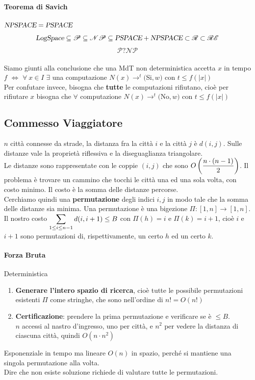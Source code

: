 \documentclass[10pt]{book}
\begin{document}
\paragraph{Teorema di Savich} $\textsl{NPSPACE} = \textsl{PSPACE}$
$$\textsl{LogSpace} \subseteq \mathscr{P} \subseteq \mathscr{NP} \subseteq \textsl{PSPACE} + \textsl{NPSPACE} \subset \mathscr{R} \subset \mathscr{RE}$$
$$\mathscr{P} ? \mathscr{NP}$$
\paragraph{} Siamo giunti alla conclusione che una MdT non deterministica accetta $x$ in tempo $f$ $\Leftrightarrow$ $\forall\:x\in I$ $\exists$ una computazione $N(x)\rightarrow^t($Si$, w)$ con $t \leq f(|x|)$\\
Per confutare invece, bisogna che \textbf{tutte} le computazioni rifiutano, cioè per rifiutare $x$ bisogna che $\forall$ computazione $N(x) \rightarrow^t ($No$, w)$ con $t \leq f(|x|)$
\subsection{Commesso Viaggiatore}
$n$ città connesse da strade, la distanza fra la città $i$ e la città $j$ è $d(i,j)$. Sulle distanze vale la proprietà riflessiva e la diseguaglianza triangolare.\\
Le distanze sono rappresentate con le coppie $(i, j)$ che sono $O\left(\mathlarger{\frac{n\cdot(n-1)}{2}}\right)$. Il problema è trovare un cammino che tocchi le città una ed una sola volta, con costo minimo. Il costo è la somma delle distanze percorse.\\
Cerchiamo quindi una \textbf{permutazione} degli indici $i, j$ in modo tale che la somma delle distanze sia minima. Una permutazione è una bigezione $\Pi : \left[1, n\right] \rightarrow \left[1, n\right]$.\\
Il nostro costo $\mathlarger{\sum_{1\leq i \leq n-1} d(i, i+1)} \leq B$ con $\Pi(h) = i$ e $\Pi(k) = i+1$, cioè $i$ e $i+1$ sono permutazioni di, rispettivamente, un certo $h$ ed un certo $k$.
\paragraph{Forza Bruta} Deterministica
\begin{enumerate}
	\item \textbf{Generare l'intero spazio di ricerca}, cioè tutte le possibile permutazioni esistenti $\Pi$ come stringhe, che sono nell'ordine di $n! = O(n!)$
	\item \textbf{Certificazione}: prendere la prima permutazione e verificare se è $\leq B$.\\
	$n$ accessi al nastro d'ingresso, uno per città, e $n^2$ per vedere la distanza di ciascuna città, quindi $O(n\cdot n^2)$
\end{enumerate}
Esponenziale in tempo ma lineare $O(n)$ in spazio, perché si mantiene una singola permutazione alla volta.\\
Dire che non esiste soluzione richiede di valutare tutte le permutazioni.
\end{document}
